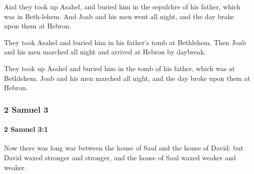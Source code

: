 			\begin{versebox}
					\item[BHS] 
					\item[ASV] And they took up Asahel, and buried him in the sepulchre of his father, which was in Beth-lehem. And Joab and his men went all night, and the day brake upon them at Hebron.
					\item[NIV] They took Asahel and buried him in his father’s tomb at Bethlehem. Then Joab and his men marched all night and arrived at Hebron by daybreak.
					\item[NRSV] They took up Asahel and buried him in the tomb of his father, which was at Bethlehem. Joab and his men marched all night, and the day broke upon them at Hebron.
			\end{versebox}
	\subsubsection{2 Samuel 3} %
		\label{2SAMUEL-3}

		\paragraph{2 Samuel 3:1} %
			\label{2SAMUEL-3-1}

			Now there was long war between the house of Saul and the house of David: but David waxed stronger and stronger, and the house of Saul waxed weaker and weaker.

